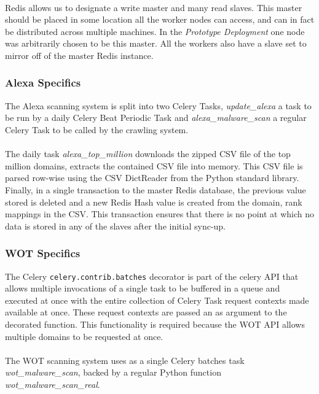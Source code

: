 \paragraph{}
Redis allows us to designate a write master and many read slaves. This master should be placed in some location all the worker nodes can access, and can in fact be distributed across multiple machines.  In the \emph{Prototype Deployment} one node was arbitrarily chosen to be this master. All the workers also have a slave set to mirror off of the master Redis instance.

\subsubsection{Alexa Specifics}
The Alexa scanning system is split into two Celery Tasks, \emph{update\_alexa} a task to be run by a daily Celery Beat Periodic Task and \emph{alexa\_malware\_scan} a regular Celery Task to be called by the crawling system.

\paragraph{}
The daily task \emph{alexa\_top\_million} downloads the zipped CSV file of the top million domains, extracts the contained CSV file into memory. This CSV file is parsed row-wise using the CSV DictReader from the Python standard library. Finally, in a single transaction to the master Redis database, the previous value stored is deleted and a new Redis Hash value is created from the domain, rank mappings in the CSV. This transaction ensures that there is no point at which no data is stored in any of the slaves after the initial sync-up.

\subsubsection{WOT Specifics}
The Celery \verb`celery.contrib.batches` decorator is part of the celery API that allows multiple invocations of a single task to be buffered in a queue and executed at once with the entire collection of Celery Task request contexts made available at once. These request contexts are passed an as argument to the decorated function. This functionality is required because the WOT API allows multiple domains to be requested at once.

\paragraph{}
The WOT scanning system uses as a single Celery batches task \emph{wot\_malware\_scan}, backed by a regular Python function \emph{wot\_malware\_scan\_real}.

